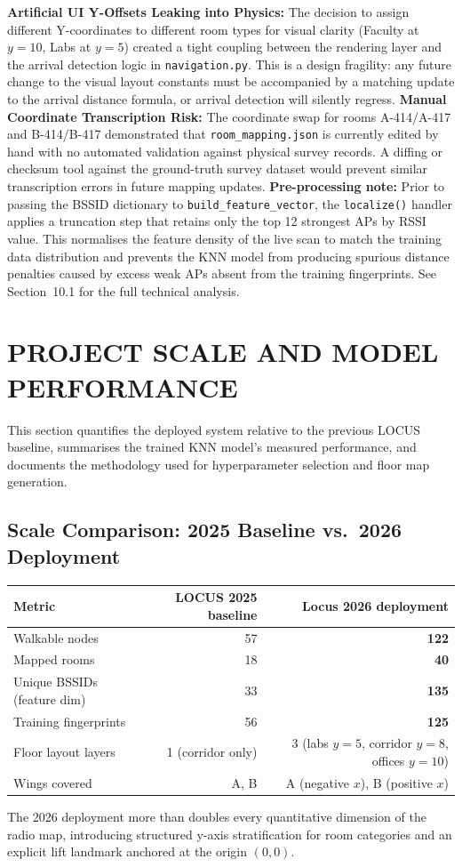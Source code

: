 \documentclass[11pt,a4paper]{article}
\begin{document}
\textbf{Artificial UI Y-Offsets Leaking into Physics:} The decision to assign different Y-coordinates to different room types for visual clarity (Faculty at $y = 10$, Labs at $y = 5$) created a tight coupling between the rendering layer and the arrival detection logic in \texttt{navigation.py}. This is a design fragility: any future change to the visual layout constants must be accompanied by a matching update to the arrival distance formula, or arrival detection will silently regress.
\textbf{Manual Coordinate Transcription Risk:} The coordinate swap for rooms A-414/A-417 and B-414/B-417 demonstrated that \texttt{room\_mapping.json} is currently edited by hand with no automated validation against physical survey records. A diffing or checksum tool against the ground-truth survey dataset would prevent similar transcription errors in future mapping updates.
\textbf{Pre-processing note:} Prior to passing the BSSID dictionary to \texttt{build\_feature\_vector}, the \texttt{localize()} handler applies a truncation step that retains only the top 12 strongest APs by RSSI value. This normalises the feature density of the live scan to match the training data distribution and prevents the KNN model from producing spurious distance penalties caused by excess weak APs absent from the training fingerprints. See Section~10.1 for the full technical analysis.
\section{PROJECT SCALE AND MODEL PERFORMANCE}
This section quantifies the deployed system relative to the previous LOCUS baseline, summarises the trained KNN model's measured performance, and documents the methodology used for hyperparameter selection and floor map generation.
\subsection{Scale Comparison: 2025 Baseline vs.\ 2026 Deployment}
\begin{center}
\renewcommand{\arraystretch}{1.25}
\begin{tabular}{@{}lrr@{}}
\toprule
\textbf{Metric} & \textbf{LOCUS 2025 baseline} & \textbf{Locus 2026 deployment} \\ \midrule
Walkable nodes              & 57    & \textbf{122} \\
Mapped rooms                & 18    & \textbf{40}  \\
Unique BSSIDs (feature dim) & 33    & \textbf{135} \\
Training fingerprints       & 56    & \textbf{125} \\
Floor layout layers         & 1 (corridor only) & 3 (labs $y{=}5$, corridor $y{=}8$, offices $y{=}10$) \\
Wings covered               & A, B  & A (negative $x$), B (positive $x$) \\
\bottomrule
\end{tabular}
\end{center}
The 2026 deployment more than doubles every quantitative dimension of the radio map, introducing structured y-axis stratification for room categories and an explicit lift landmark anchored at the origin $(0, 0)$.
\end{document}
